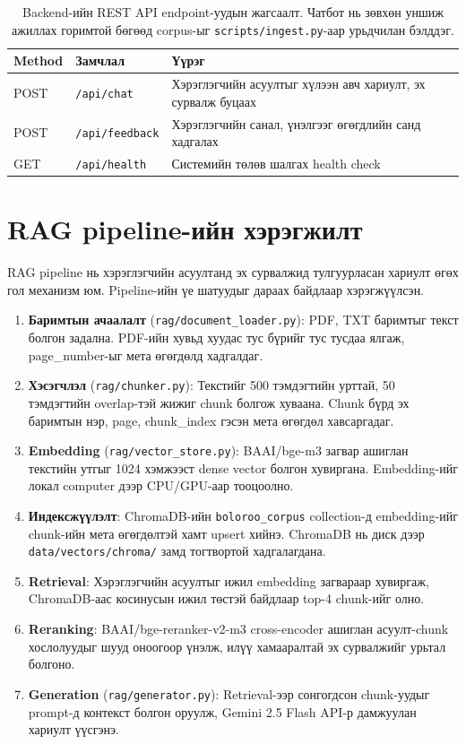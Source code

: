 \begin{table}[H]
\centering
\begin{tabular}{|p{1.4cm}|p{3.6cm}|p{8.5cm}|}
\hline
\textbf{Method} & \textbf{Замчлал} & \textbf{Үүрэг} \\ \hline
POST & \texttt{/api/chat} & Хэрэглэгчийн асуултыг хүлээн авч хариулт, эх сурвалж буцаах \\ \hline
POST & \texttt{/api/feedback} & Хэрэглэгчийн санал, үнэлгээг өгөгдлийн санд хадгалах \\ \hline
GET & \texttt{/api/health} & Системийн төлөв шалгах health check \\ \hline
\end{tabular}
\caption[API endpoint-ийн жагсаалт]{Backend-ийн REST API endpoint-уудын жагсаалт. Чатбот нь зөвхөн уншиж ажиллах горимтой бөгөөд corpus-ыг \texttt{scripts/ingest.py}-аар урьдчилан бэлддэг.}
\label{tab:api-endpoints}
\end{table}



\section{RAG pipeline-ийн хэрэгжилт}

RAG pipeline нь хэрэглэгчийн асуултанд эх сурвалжид тулгуурласан хариулт өгөх гол механизм юм. Pipeline-ийн үе шатуудыг дараах байдлаар хэрэгжүүлсэн.

\begin{enumerate}
    \item \textbf{Баримтын ачаалалт} (\texttt{rag/document\_loader.py}): PDF, TXT баримтыг текст болгон задална. PDF-ийн хувьд хуудас тус бүрийг тус тусдаа ялгаж, page\_number-ыг мета өгөгдөлд хадгалдаг.
    \item \textbf{Хэсэгчлэл} (\texttt{rag/chunker.py}): Текстийг 500 тэмдэгтийн урттай, 50 тэмдэгтийн overlap-тэй жижиг chunk болгож хуваана. Chunk бүрд эх баримтын нэр, page, chunk\_index гэсэн мета өгөгдөл хавсаргадаг.
    \item \textbf{Embedding} (\texttt{rag/vector\_store.py}): BAAI/bge-m3 загвар ашиглан текстийн утгыг 1024 хэмжээст dense vector болгон хувиргана. Embedding-ийг локал computer дээр CPU/GPU-аар тооцоолно.
    \item \textbf{Индексжүүлэлт}: ChromaDB-ийн \texttt{boloroo\_corpus} collection-д embedding-ийг chunk-ийн мета өгөгдөлтэй хамт upsert хийнэ. ChromaDB нь диск дээр \texttt{data/vectors/chroma/} замд тогтвортой хадгалагдана.
    \item \textbf{Retrieval}: Хэрэглэгчийн асуултыг ижил embedding загвараар хувиргаж, ChromaDB-аас косинусын ижил төстэй байдлаар top-4 chunk-ийг олно.
    \item \textbf{Reranking}: BAAI/bge-reranker-v2-m3 cross-encoder ашиглан асуулт-chunk хослолуудыг шууд оноогоор үнэлж, илүү хамааралтай эх сурвалжийг урьтал болгоно.
    \item \textbf{Generation} (\texttt{rag/generator.py}): Retrieval-ээр сонгогдсон chunk-уудыг prompt-д контекст болгон оруулж, Gemini 2.5 Flash API-р дамжуулан хариулт үүсгэнэ.
\end{enumerate}

